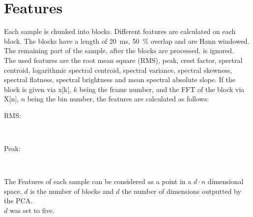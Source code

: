 ﻿\section{Features}
\label{sec:Features}
Each sample is chunked into blocks. Different features are calculated on each block. The blocks have a length of 20~ms, 50~\% overlap and are Hann windowed. The remaining part of the sample, after the blocks are processed, is ignored.\\
The used features are the root mean square (RMS), peak, crest factor, spectral centroid, logarithmic spectral centroid, spectral variance, spectral skewness, spectral flatness, spectral brightness and mean spectral absolute slope. If the block is given via x[k], $k$ being the frame number, and the FFT of the block via X[n], $n$ being the bin number, the features are calculated as follows:
\begin{description}
    \item[RMS:]\\
        
    \item[Peak:]\\
        
\end{description}


The Features of each sample can be considered as a point in a $d \cdot n$ dimensional space. $d$ is the number of blocks and $d$ the number of dimensions outputted by the PCA.\\
$d$ was set to five. 